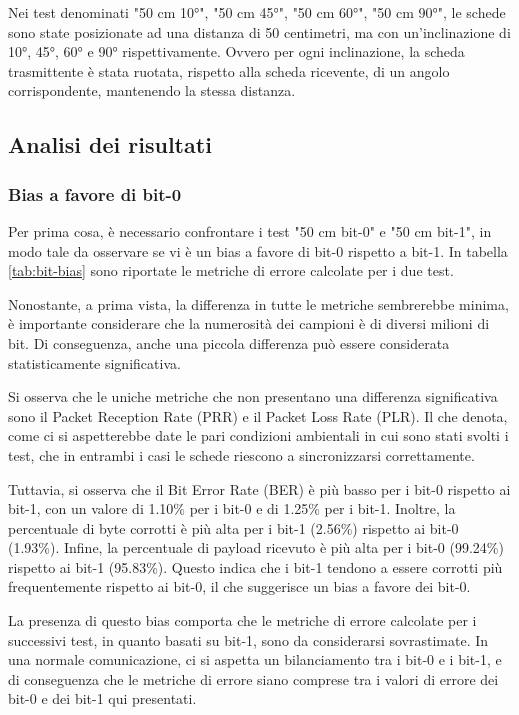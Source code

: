 Nei test denominati "50 cm 10°", "50 cm 45°", "50 cm 60°", "50 cm 90°", le schede sono state posizionate ad una distanza di 50 centimetri, ma con un'inclinazione di 10°, 45°, 60° e 90° rispettivamente. Ovvero per ogni inclinazione, la scheda trasmittente è stata ruotata, rispetto alla scheda ricevente, di un angolo corrispondente, mantenendo la stessa distanza.

\subsection{Analisi dei risultati}
\subsubsection{Bias a favore di bit-0}
Per prima cosa, è necessario confrontare i test "50 cm bit-0" e "50 cm bit-1", in modo tale da osservare se vi è un bias a favore di bit-0 rispetto a bit-1. In tabella \ref{tab:bit-bias} sono riportate le metriche di errore calcolate per i due test.

Nonostante, a prima vista, la differenza in tutte le metriche sembrerebbe minima, è importante considerare che la numerosità dei campioni è di diversi milioni di bit. Di conseguenza, anche una piccola differenza può essere considerata statisticamente significativa.

Si osserva che le uniche metriche che non presentano una differenza significativa sono il Packet Reception Rate (PRR) e il Packet Loss Rate (PLR). Il che denota, come ci si aspetterebbe date le pari condizioni ambientali in cui sono stati svolti i test, che in entrambi i casi le schede riescono a sincronizzarsi correttamente.

Tuttavia, si osserva che il Bit Error Rate (BER) è più basso per i bit-0 rispetto ai bit-1, con un valore di 1.10\% per i bit-0 e di 1.25\% per i bit-1. Inoltre, la percentuale di byte corrotti è più alta per i bit-1 (2.56\%) rispetto ai bit-0 (1.93\%). Infine, la percentuale di payload ricevuto è più alta per i bit-0 (99.24\%) rispetto ai bit-1 (95.83\%). Questo indica che i bit-1 tendono a essere corrotti più frequentemente rispetto ai bit-0, il che suggerisce un bias a favore dei bit-0.

La presenza di questo bias comporta che le metriche di errore calcolate per i successivi test, in quanto basati su bit-1, sono da considerarsi sovrastimate. In una normale comunicazione, ci si aspetta un bilanciamento tra i bit-0 e i bit-1, e di conseguenza che le metriche di errore siano comprese tra i valori di errore dei bit-0 e dei bit-1 qui presentati.

